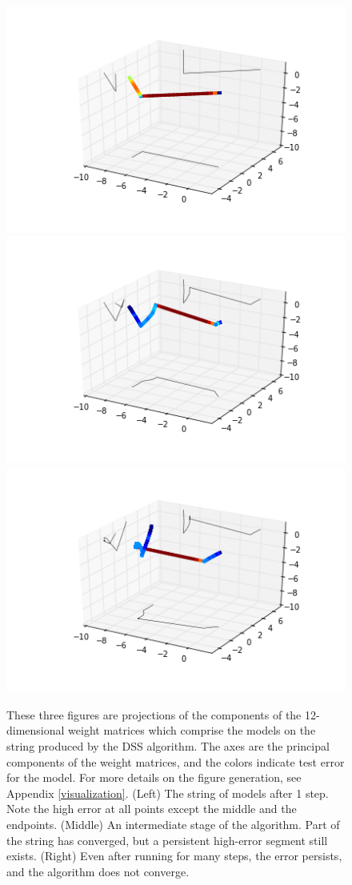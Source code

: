 \begin{figure}
\label{discfigs}
\centering
\includegraphics[width=.4\textwidth]{../Plots/disc1}
\includegraphics[width=.4\textwidth]{../Plots/disc2}
\includegraphics[width=.4\textwidth]{../Plots/disc3}
\caption{These three figures are projections of the components of the 12-dimensional weight matrices which comprise the models on the string produced by the DSS algorithm.  The axes are the principal components of the weight matrices, and the colors indicate test error for the model.  For more details on the figure generation, see Appendix \ref{visualization}. (Left) The string of models after 1 step.  Note the high error at all points except the middle and the endpoints.  (Middle) An intermediate stage of the algorithm.  Part of the string has converged, but a persistent high-error segment still exists.  (Right) Even after running for many steps, the error persists, and the algorithm does not converge.}
\end{figure}
